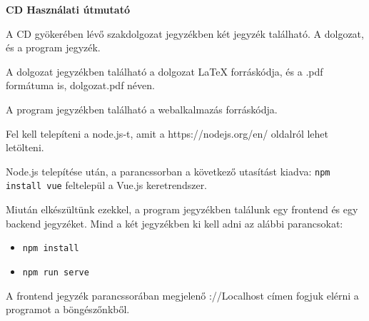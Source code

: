 \pagestyle{empty}

\noindent \textbf{\Large CD Használati útmutató}

\vskip 1cm

A CD gyökerében lévő szakdolgozat jegyzékben két jegyzék található. A dolgozat, és a program jegyzék. 

A dolgozat jegyzékben található a dolgozat LaTeX forráskódja, és a .pdf formátuma is, dolgozat.pdf néven. 

A program jegyzékben található a webalkalmazás forráskódja. 

Fel kell telepíteni a node.js-t, amit a https://nodejs.org/en/ oldalról lehet letölteni.

Node.js telepítése után, a parancssorban a következő utasítást kiadva: \texttt{npm install vue} feltelepül a Vue.js keretrendszer.


Miután elkészültünk ezekkel, a program jegyzékben találunk egy frontend és egy backend jegyzéket. Mind a két jegyzékben ki kell adni az alábbi parancsokat: 
\begin{itemize}
    \item \texttt{npm install}
    \item \texttt{npm run serve}
\end{itemize}


A frontend jegyzék parancssorában megjelenő ://Localhost címen fogjuk elérni a programot a böngészőnkből.
